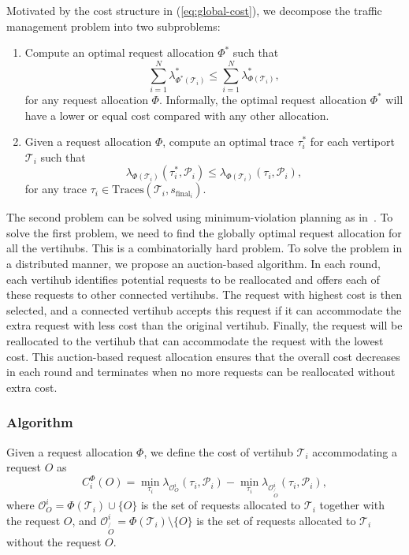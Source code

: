Motivated by the cost structure in (\ref{eq:global-cost}), we decompose the traffic management problem into two subproblems:
\begin{enumerate}
	\item Compute an optimal request allocation $\Phi^*$ such that
	\begin{equation*}
		\sum_{i=1}^N \lambda_{\Phi^*(\mathcal{T}_i)}^* \leq \sum_{i=1}^N \lambda_{\Phi(\mathcal{T}_i)}^*,
	\end{equation*}
	for any request allocation $\Phi$. Informally, the optimal request allocation $\Phi^{*}$ will have a lower or equal cost compared with any other allocation. 
	\item Given a request allocation $\Phi$, compute an optimal trace $\tau_i^*$ for each vertiport $\mathcal{T}_i$ such that
	\begin{equation*}
		\lambda_{\Phi(\mathcal{T}_i)}(\tau_i^*, \mathcal{P}_i) \leq \lambda_{\Phi(\mathcal{T}_i)}(\tau_i, \mathcal{P}_i),
	\end{equation*}
	for any trace $\tau_i \in \text{Traces}(\mathcal{T}_i,s_{\text{final}_i})$.
\end{enumerate}
The second problem can be solved using minimum-violation planning as in~\cite{Tumova:2013:ACC,Tumova:2013:LCS}.
To solve the first problem, we need to find the globally optimal request allocation for all the vertihubs. This is a combinatorially hard problem. To solve the problem in a distributed manner, we propose an auction-based algorithm. In each round, each vertihub identifies potential requests to be reallocated and offers each of these requests to other connected vertihubs.  The request with highest cost is then selected, and a connected vertihub accepts this request if it can accommodate the extra request with less cost than the original vertihub. Finally, the request will be reallocated to the vertihub that can accommodate the request with the lowest cost. This auction-based request allocation ensures that the overall cost decreases in each round and terminates when no more requests can be reallocated without extra cost.

\subsubsection{Algorithm} 
Given a request allocation $\Phi$, we define the cost of vertihub $\mathcal{T}_i$ accommodating a request $O$ as
\begin{equation}
	C_i^\Phi(O) = \min_{\tau_i} \lambda_{\mathcal{O}^i_O}(\tau_i, \mathcal{P}_i) - \min_{\tau_i} \lambda_{\mathcal{O}^i_{\not{O}}}(\tau_i, \mathcal{P}_i),
\end{equation}
where $\mathcal{O}^i_O = \Phi(\mathcal{T}_i) \cup \{O\}$ is the set of requests allocated to $\mathcal{T}_i$ together with the request $O$, and $\mathcal{O}^i_{\not{O}} = \Phi(\mathcal{T}_i) \setminus \{O\}$ is the set of requests allocated to $\mathcal{T}_i$ without the request $O$.

